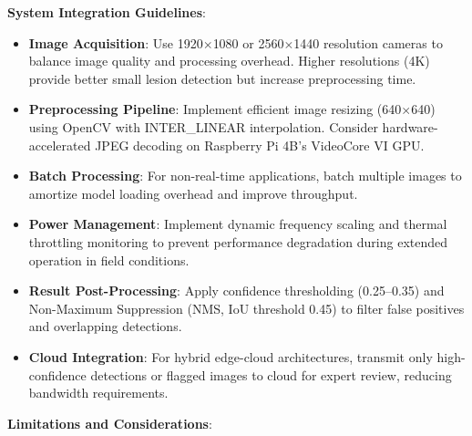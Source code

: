 \textbf{System Integration Guidelines}:

\begin{itemize}
\item \textbf{Image Acquisition}: Use 1920$\times$1080 or 2560$\times$1440 resolution cameras to balance image quality and processing overhead. Higher resolutions (4K) provide better small lesion detection but increase preprocessing time.

\item \textbf{Preprocessing Pipeline}: Implement efficient image resizing (640$\times$640) using OpenCV with INTER\_LINEAR interpolation. Consider hardware-accelerated JPEG decoding on Raspberry Pi 4B's VideoCore VI GPU.

\item \textbf{Batch Processing}: For non-real-time applications, batch multiple images to amortize model loading overhead and improve throughput.

\item \textbf{Power Management}: Implement dynamic frequency scaling and thermal throttling monitoring to prevent performance degradation during extended operation in field conditions.

\item \textbf{Result Post-Processing}: Apply confidence thresholding (0.25--0.35) and Non-Maximum Suppression (NMS, IoU threshold 0.45) to filter false positives and overlapping detections.

\item \textbf{Cloud Integration}: For hybrid edge-cloud architectures, transmit only high-confidence detections or flagged images to cloud for expert review, reducing bandwidth requirements.
\end{itemize}

\textbf{Limitations and Considerations}:

